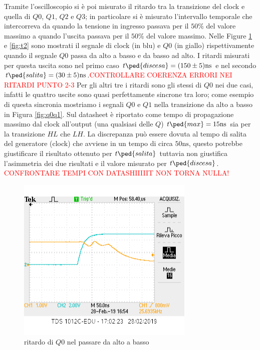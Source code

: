 \documentclass[10pt,a4paper]{article}
\begin{document}
Tramite l'oscilloscopio si è poi misurato il ritardo tra la transizione del clock e quella di $Q0$, $Q1$, $Q2$ e $Q3$; in particolare si è misurato l'intervallo temporale che intercorreva da quando la tensione in ingresso passava per il $50\%$ del valore massimo a quando l'uscita passava per  il $50\%$ del valore massimo. Nelle Figure \ref{fig:t1} e \ref{fig:t2} sono mostrati il segnale di clock (in blu) e $Q0$ (in giallo) rispettivamente quando il segnale  $Q0$ passa da alto a basso e da basso ad alto. I ritardi misurati per questa uscita 
sono nel primo caso $t\ped{discesa} = (150 \pm 5)\si{\nano\second}$ e nel secondo  $t\ped{salita} = (30 \pm 5)\si{\nano\second}$.\textcolor{red}{CONTROLLARE COERENZA ERRORI NEI RITARDI PUNTO 2-3}
Per gli altri tre i ritardi sono gli stessi di $Q0$  nei due casi, infatti le quattro uscite sono quasi perfettamente sincrone tra loro; come esempio  di questa sincronia mostriamo  i segnali $Q0$ e $Q1$ nella transizione da alto a basso in Figura \ref{fig:q0q1}.
Sul datasheet è riportato come tempo di propagazione massimo dal clock all'output (una qualsiasi delle $Q$) $t\ped{max} = 15\si{\nano\second}$ sia per la transizione $HL$ che $LH$. La discrepanza può essere dovuta al tempo di salita del generatore (clock) che avviene in un tempo di circa $50 \si{\nano\second}$, questo potrebbe giustificare il risultato ottenuto per $t\ped{salita} $ tuttavia non giustifica l'asimmetria dei due risultati e il valore misurato per $t\ped{discesa}$.
\textcolor{red}{CONFRONTARE TEMPI CON DATASHIIIIIT NON TORNA NULLA!}
\begin{figure}[h]
			\centering
			\includegraphics[scale=0.85]{tcounter}
			\caption{ritardo di $Q0$ nel passare da alto a basso}
			\label{fig:t1}
\end{figure}
\end{document}
